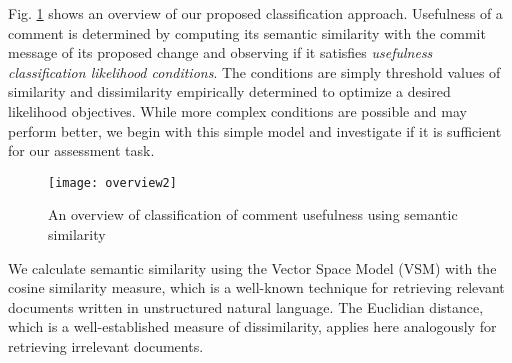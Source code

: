 Fig. \ref{fig:overview} shows an overview of our proposed classification approach.
Usefulness of a comment is determined by computing its semantic similarity with the commit message of its proposed change and observing if it satisfies \emph{usefulness classification likelihood conditions}.
The conditions are simply threshold values of similarity and dissimilarity empirically determined to optimize a desired likelihood objectives. While more complex conditions are possible and may perform better, we begin with this simple model and investigate if it is sufficient for our assessment task.


\begin{figure}[!t]
\centering
\texttt{[image: overview2]}
\caption{An overview of classification of comment usefulness using semantic similarity}
\label{fig:overview}
\end{figure}

We calculate semantic similarity using the Vector Space Model (VSM) 
with the cosine similarity measure, which is a well-known technique for retrieving relevant documents written in unstructured natural language. The Euclidian distance, which is a well-established measure of dissimilarity,  applies here analogously for retrieving irrelevant documents.

